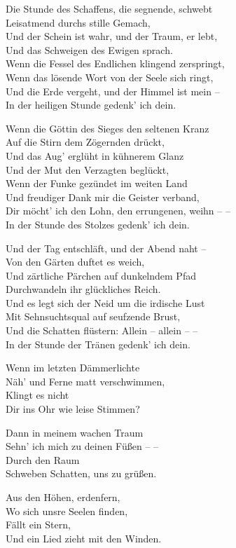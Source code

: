 \begin{liebesgedicht}
Die Stunde des Schaffens, die segnende, schwebt\\ Leisatmend durchs
stille Gemach,\\ Und der Schein ist wahr, und der Traum, er lebt,\\
Und das Schweigen des Ewigen sprach.\\ Wenn die Fessel des
Endlichen klingend zerspringt,\\ Wenn das lösende Wort von der
Seele sich ringt,\\ Und die Erde vergeht, und der Himmel ist mein
–\\ In der heiligen Stunde gedenk' ich dein.

Wenn die Göttin des Sieges den seltenen Kranz\\ Auf die Stirn dem
Zögernden drückt,\\ Und das Aug' erglüht in kühnerem Glanz\\ Und
der Mut den Verzagten beglückt,\\ Wenn der Funke gezündet im weiten
Land\\ Und freudiger Dank mir die Geister verband,\\ Dir möcht' ich
den Lohn, den errungenen, weihn – –\\ In der Stunde des Stolzes
gedenk' ich dein.

Und der Tag entschläft, und der Abend naht –\\ Von den Gärten
duftet es weich,\\ Und zärtliche Pärchen auf dunkelndem Pfad\\
Durchwandeln ihr glückliches Reich.\\ Und es legt sich der Neid um
die irdische Lust\\ Mit Sehnsuchtsqual auf seufzende Brust,\\ Und
die Schatten flüstern: Allein – allein – –\\ In der Stunde der
Tränen gedenk' ich dein.
\end{liebesgedicht}

\begin{liebesgedicht}
\quad Wenn im letzten Dämmerlichte\\
Näh' und Ferne matt verschwimmen,\\
\qquad\quad Klingt es nicht\\
Dir ins Ohr wie leise Stimmen?

\quad Dann in meinem wachen Traum\\
Sehn' ich mich zu deinen Füßen – –\\
\qquad\quad Durch den Raum\\
Schweben Schatten, uns zu grüßen.

\quad Aus den Höhen, erdenfern,\\
Wo sich unsre Seelen finden,\\
\qquad\quad Fällt ein Stern,\\
Und ein Lied zieht mit den Winden.
\end{liebesgedicht}


